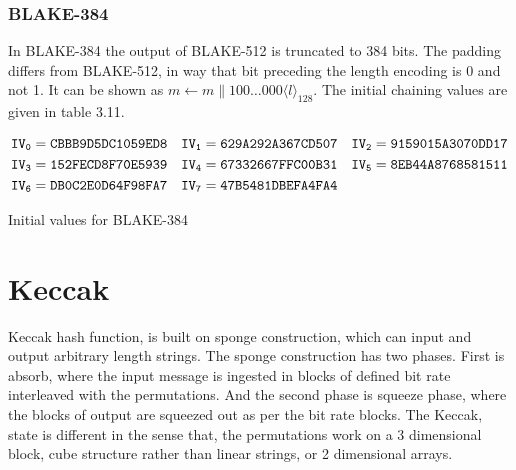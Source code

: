   \subsubsection{BLAKE-384}
  In BLAKE-384 the output of BLAKE-512 is truncated to 384 bits. The padding differs from BLAKE-512, in way that bit
  preceding the length encoding is 0 and not 1. It can be shown as $m \gets m \parallel 100 \dots 000 \langle l \rangle_{128}$. The
  initial chaining values are given in table 3.11.
  \begin{table}[h]
    \begin{align*}
      {\tt IV_{0}} &= {\tt CBBB9D5DC1059ED8} & {\tt IV_{1}} &= {\tt 629A292A367CD507} & {\tt IV_{2}} &= {\tt 9159015A3070DD17} \\
      {\tt IV_{3}} &= {\tt 152FECD8F70E5939} & {\tt IV_{4}} &= {\tt 67332667FFC00B31} & {\tt IV_{5}} &= {\tt 8EB44A8768581511} \\
      {\tt IV_{6}} &= {\tt DB0C2E0D64F98FA7} & {\tt IV_{7}} &= {\tt 47B5481DBEFA4FA4} &                                        \\      
    \end{align*}
    \caption{Initial values for BLAKE-384\cite{00002}}
  \end{table}

\newpage

\section{Keccak}
Keccak hash function, is built on sponge construction, which can input and output arbitrary length strings. The sponge
construction has two phases. First is absorb, where the input message is ingested in blocks of defined bit rate interleaved
with the permutations. And the second phase is squeeze phase, where the blocks of output are squeezed out as per the 
bit rate blocks. The Keccak, state is different in the sense that, the permutations work on a 3 dimensional block, cube
structure rather than linear strings, or 2 dimensional arrays.

